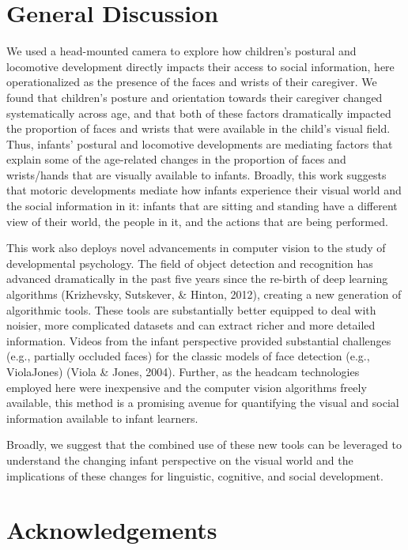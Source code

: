 \documentclass[10pt, letterpaper]{article}
\begin{document}
\section{General Discussion}\label{general-discussion}

We used a head-mounted camera to explore how children's postural and
locomotive development directly impacts their access to social
information, here operationalized as the presence of the faces and
wrists of their caregiver. We found that children's posture and
orientation towards their caregiver changed systematically across age,
and that both of these factors dramatically impacted the proportion of
faces and wrists that were available in the child's visual field. Thus,
infants' postural and locomotive developments are mediating factors that
explain some of the age-related changes in the proportion of faces and
wrists/hands that are visually available to infants. Broadly, this work
suggests that motoric developments mediate how infants experience their
visual world and the social information in it: infants that are sitting
and standing have a different view of their world, the people in it, and
the actions that are being performed.

This work also deploys novel advancements in computer vision to the
study of developmental psychology. The field of object detection and
recognition has advanced dramatically in the past five years since the
re-birth of deep learning algorithms (Krizhevsky, Sutskever, \& Hinton,
2012), creating a new generation of algorithmic tools. These tools are
substantially better equipped to deal with noisier, more complicated
datasets and can extract richer and more detailed information. Videos
from the infant perspective provided substantial challenges (e.g.,
partially occluded faces) for the classic models of face detection
(e.g., ViolaJones) (Viola \& Jones, 2004). Further, as the headcam
technologies employed here were inexpensive and the computer vision
algorithms freely available, this method is a promising avenue for
quantifying the visual and social information available to infant
learners.

Broadly, we suggest that the combined use of these new tools can be
leveraged to understand the changing infant perspective on the visual
world and the implications of these changes for linguistic, cognitive,
and social development.

\section{Acknowledgements}\label{acknowledgements}
\end{document}
